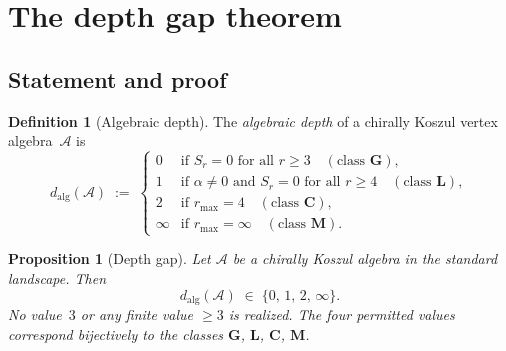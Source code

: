 \documentclass[11pt,reqno]{amsart}
\newtheorem{proposition}[theorem]{Proposition}
\theoremstyle{definition}
\newtheorem{definition}[theorem]{Definition}
\theoremstyle{remark}
\newcommand{\cA}{\mathcal{A}}
\numberwithin{equation}{section}
\begin{document}
\section{The depth gap theorem}\label{sec:depth-gap}

\subsection{Statement and proof}\label{subsec:depth-gap-proof}

\begin{definition}[Algebraic
depth]\label{def:algebraic-depth}
The \emph{algebraic depth} of a chirally Koszul vertex
algebra~$\cA$ is
\[
 d_{\mathrm{alg}}(\cA)
 \;:=\;
 \begin{cases}
  0 & \text{if } S_r = 0 \text{ for all } r \ge 3
  \quad(\text{class } \mathbf{G}), \\
  1 & \text{if } \alpha \ne 0 \text{ and } S_r = 0
  \text{ for all } r \ge 4
  \quad(\text{class } \mathbf{L}), \\
  2 & \text{if } r_{\max} = 4
  \quad(\text{class } \mathbf{C}), \\
  \infty & \text{if } r_{\max} = \infty
  \quad(\text{class } \mathbf{M}).
 \end{cases}
\]
\end{definition}

\begin{proposition}[Depth gap]\label{prop:depth-gap}
Let $\cA$ be a chirally Koszul algebra in the standard
landscape. Then
\begin{equation}\label{eq:depth-gap}
 d_{\mathrm{alg}}(\cA)
 \;\in\;
 \{0,\, 1,\, 2,\, \infty\}.
\end{equation}
No value~$3$ or any finite value $\ge 3$ is realized.
The four permitted values correspond bijectively to the
classes $\mathbf{G}$, $\mathbf{L}$, $\mathbf{C}$,
$\mathbf{M}$.
\end{proposition}
\end{document}
